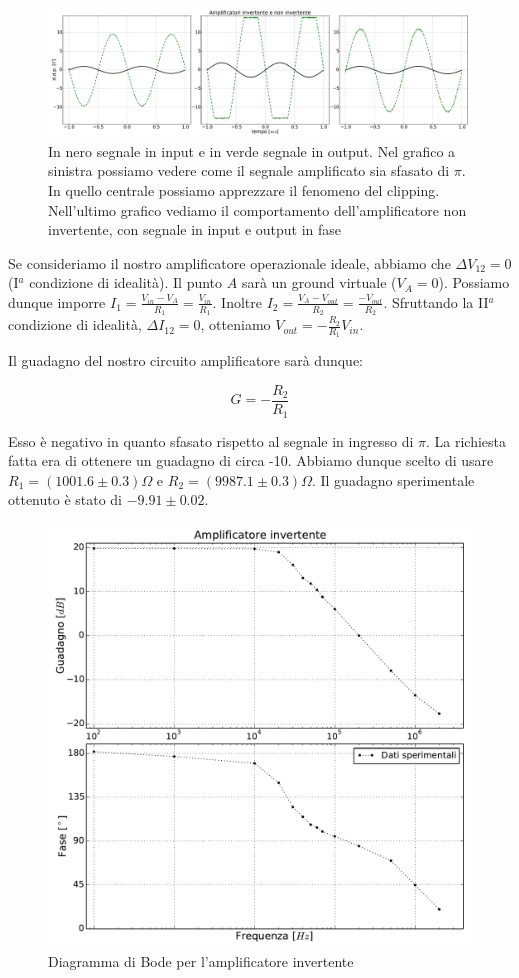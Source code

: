 \begin{figure}[h!]
	\centering
			\includegraphics[width=\textwidth]{serie_01_ampl.pdf}
			\caption{In nero segnale in input e in verde segnale in output. Nel grafico a sinistra possiamo vedere come il segnale amplificato sia sfasato di $\pi$. In quello centrale possiamo apprezzare il fenomeno del clipping. Nell'ultimo grafico vediamo il comportamento dell'amplificatore non invertente, con segnale in input e output in fase}
			\label{fig:der}
\end{figure}

Se consideriamo il nostro amplificatore operazionale ideale, abbiamo che $\Delta V_{12}=0$ (I$^a$ condizione di idealità).
Il punto $A$ sarà un ground virtuale ($V_A = 0$).
Possiamo dunque imporre $I_1=\frac{V_{in}-V_A}{R_1}=\frac{V_{in}}{R_1}$.
Inoltre $I_2=\frac{V_A-V_{out}}{R_2}=\frac{-V_{out}}{R_2}$.
Sfruttando la II$^a$ condizione di idealità, $\Delta I_{12}=0$, otteniamo $V_{out}=-\frac{R_2}{R_1} V_{in}$.

Il guadagno del nostro circuito amplificatore sarà dunque:

\begin{equation}
G=-\frac{R_2}{R_1}
\end{equation}

Esso è negativo in quanto sfasato rispetto al segnale in ingresso di $\pi$.
La richiesta fatta era di ottenere un guadagno di circa -10.
Abbiamo dunque scelto di usare $R_1=(1001.6\pm0.3)\Omega$ e $R_2=(9987.1\pm0.3)\Omega$.
Il guadagno sperimentale ottenuto è stato di $-9.91 \pm 0.02$.

\begin{figure}
			\includegraphics[width=.48\textwidth]{b_inv.pdf}
			\caption{Diagramma di Bode per l'amplificatore invertente}
			\label{fig:invbode}
\end{figure}

